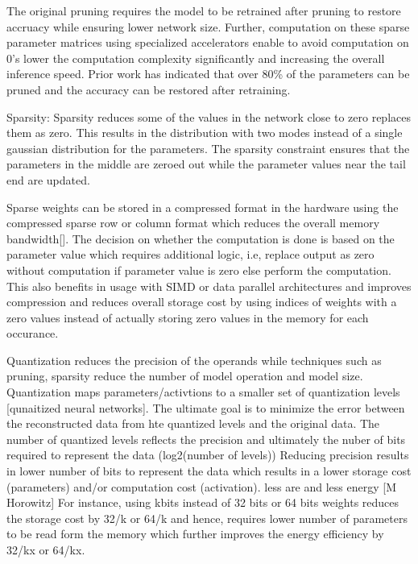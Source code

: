 The original pruning requires the model to be retrained after pruning to restore accruacy while ensuring lower network size.
Further, computation on these sparse parameter matrices using specialized accelerators enable to avoid computation on 0's lower the computation complexity significantly and increasing the overall inference speed.
Prior work has indicated that over 80\% of the parameters can be pruned and the accuracy can be restored after retraining.

Sparsity: Sparsity reduces some of the values in the network close to zero replaces them as zero. This results in the distribution with two modes instead of a single gaussian distribution for the parameters.
The sparsity constraint ensures that the parameters in the middle are zeroed out while the parameter values near the tail end are updated.

Sparse weights can be stored in a compressed format in the hardware using the compressed sparse row or column format which reduces the overall memory bandwidth[].
The decision on whether the computation is done is based on the parameter value which requires additional logic, i.e, replace output as zero without computation if parameter value is zero else perform the computation.
This also benefits in usage with SIMD or data parallel architectures and improves compression and reduces overall storage cost by using indices of weights with a zero values instead of actually storing zero values in the memory for each occurance.

Quantization reduces the precision of the operands while techniques such as pruning, sparsity reduce the number of model operation and model size.
Quantization maps parameters/activtions to a smaller set of quantization levels [qunaitized neural networks].
The ultimate goal is to minimize the error between the reconstructed data from hte quantized levels and the original data.
The number of quantized levels reflects the precision and ultimately the nuber of bits required to represent the data (log2(number of levels))
Reducing precision results in lower number of bits to represent the data which results in a lower storage cost (parameters) and/or computation cost (activation). less are and less energy [M Horowitz]
For instance, using kbits instead of 32 bits or 64 bits weights reduces the storage cost by 32/k or 64/k and hence, requires lower number of parameters to be read form the memory which further improves the energy efficiency by 32/kx or 64/kx.

